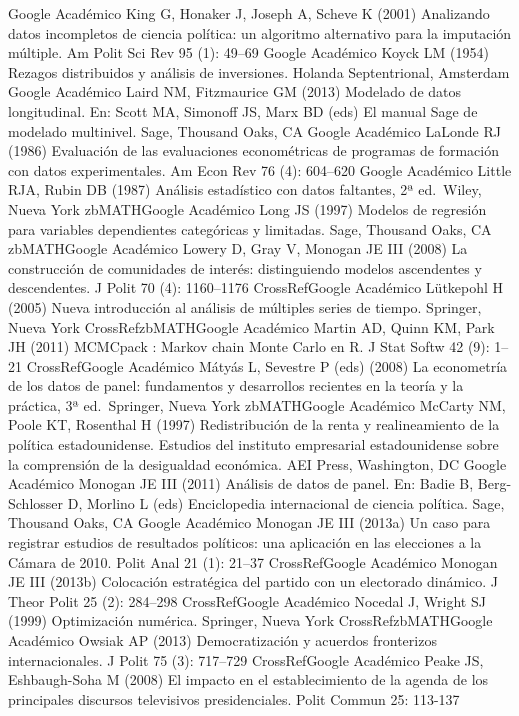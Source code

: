 \documentclass[
]{book}
\begin{document}
Google Académico
King G, Honaker J, Joseph A, Scheve K (2001) Analizando datos incompletos de ciencia política: un algoritmo alternativo para la imputación múltiple. Am Polit Sci Rev 95 (1): 49--69
Google Académico
Koyck LM (1954) Rezagos distribuidos y análisis de inversiones. Holanda Septentrional, Amsterdam
Google Académico
Laird NM, Fitzmaurice GM (2013) Modelado de datos longitudinal. En: Scott MA, Simonoff JS, Marx BD (eds) El manual Sage de modelado multinivel. Sage, Thousand Oaks, CA
Google Académico
LaLonde RJ (1986) Evaluación de las evaluaciones econométricas de programas de formación con datos experimentales. Am Econ Rev 76 (4): 604--620
Google Académico
Little RJA, Rubin DB (1987) Análisis estadístico con datos faltantes, 2ª ed.~Wiley, Nueva York
zbMATHGoogle Académico
Long JS (1997) Modelos de regresión para variables dependientes categóricas y limitadas. Sage, Thousand Oaks, CA
zbMATHGoogle Académico
Lowery D, Gray V, Monogan JE III (2008) La construcción de comunidades de interés: distinguiendo modelos ascendentes y descendentes. J Polit 70 (4): 1160--1176
CrossRefGoogle Académico
Lütkepohl H (2005) Nueva introducción al análisis de múltiples series de tiempo. Springer, Nueva York
CrossRefzbMATHGoogle Académico
Martin AD, Quinn KM, Park JH (2011) MCMCpack : Markov chain Monte Carlo en R. J Stat Softw 42 (9): 1--21
CrossRefGoogle Académico
Mátyás L, Sevestre P (eds) (2008) La econometría de los datos de panel: fundamentos y desarrollos recientes en la teoría y la práctica, 3ª ed.~Springer, Nueva York
zbMATHGoogle Académico
McCarty NM, Poole KT, Rosenthal H (1997) Redistribución de la renta y realineamiento de la política estadounidense. Estudios del instituto empresarial estadounidense sobre la comprensión de la desigualdad económica. AEI Press, Washington, DC
Google Académico
Monogan JE III (2011) Análisis de datos de panel. En: Badie B, Berg-Schlosser D, Morlino L (eds) Enciclopedia internacional de ciencia política. Sage, Thousand Oaks, CA
Google Académico
Monogan JE III (2013a) Un caso para registrar estudios de resultados políticos: una aplicación en las elecciones a la Cámara de 2010. Polit Anal 21 (1): 21--37
CrossRefGoogle Académico
Monogan JE III (2013b) Colocación estratégica del partido con un electorado dinámico. J Theor Polit 25 (2): 284--298
CrossRefGoogle Académico
Nocedal J, Wright SJ (1999) Optimización numérica. Springer, Nueva York
CrossRefzbMATHGoogle Académico
Owsiak AP (2013) Democratización y acuerdos fronterizos internacionales. J Polit 75 (3): 717--729
CrossRefGoogle Académico
Peake JS, Eshbaugh-Soha M (2008) El impacto en el establecimiento de la agenda de los principales discursos televisivos presidenciales. Polit Commun 25: 113-137
\end{document}

